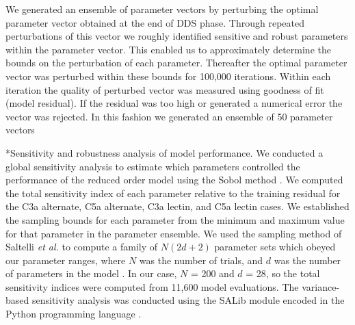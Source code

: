 \documentclass[12pt]{article}
\makeatletter
\renewcommand\subsection{\@startsection
	{subsection}{2}{0mm}
	{-0.05in}
	{-0.5\baselineskip}
	{\normalfont\normalsize\bfseries}}
\makeatother
\begin{document}
We generated an ensemble of parameter vectors by perturbing the optimal parameter vector obtained at the end of DDS phase. Through repeated perturbations of this vector we roughly identified sensitive and robust parameters within the parameter vector. This enabled us to approximately determine the bounds on the perturbation of each parameter. Thereafter the optimal parameter vector was perturbed within these bounds for 100,000 iterations. Within each iteration the quality of perturbed vector was measured using goodness of fit (model residual). If the residual was too high or generated a numerical error the vector was rejected. In this fashion we generated an ensemble of 50 parameter vectors


\subsection*{Sensitivity and robustness analysis of model performance.}
We conducted a global sensitivity analysis to estimate which parameters controlled the performance of the reduced order model using the Sobol method \cite{SOBOL_METHOD}.
We computed the total sensitivity index of each parameter relative to the training residual for the C3a alternate, C5a alternate, C3a lectin, and C5a lectin cases.
We established the sampling bounds for each parameter from the minimum and maximum value for that parameter in the parameter ensemble.
We used the sampling method of Saltelli \textit{et al.} to compute a family of $N\left(2d+2\right)$ parameter sets which obeyed our parameter ranges,
where $N$ was the number of trials, and $d$ was the number of parameters in the model \cite{saltelli2010variance}.
In our case, $N$ = 200 and $d$ = 28, so the total sensitivity indices were computed from 11,600 model evaluations.
The variance-based sensitivity analysis was conducted using the SALib module encoded in the Python programming language \cite{SALIB}.
\end{document}
